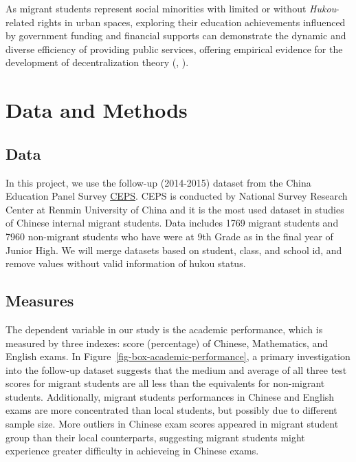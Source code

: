 \documentclass[
  man,
  floatsintext,
  longtable,
  nolmodern,
  notxfonts,
  notimes,
  colorlinks=true,linkcolor=blue,citecolor=blue,urlcolor=blue]{apa7}
\begin{document}
As migrant students represent social minorities with limited or without
\emph{Hukou}-related rights in urban spaces, exploring their education
achievements influenced by government funding and financial supports can
demonstrate the dynamic and diverse efficiency of providing public
services, offering empirical evidence for the development of
decentralization theory
(,
).

\section{Data and Methods}\label{data-and-methods}

\subsection{Data}\label{data}

In this project, we use the follow-up (2014-2015) dataset from the China
Education Panel Survey
\href{http://ceps.ruc.edu.cn/English/Home.htm}{CEPS}. CEPS is conducted
by National Survey Research Center at Renmin University of China and it
is the most used dataset in studies of Chinese internal migrant
students. Data includes 1769 migrant students and 7960 non-migrant
students who have were at 9th Grade as in the final year of Junior High.
We will merge datasets based on student, class, and school id, and
remove values without valid information of hukou status.

\subsection{Measures}\label{measures}

The dependent variable in our study is the academic performance, which
is measured by three indexes: score (percentage) of Chinese,
Mathematics, and English exams. In
Figure~\ref{fig-box-academic-performance}, a primary investigation into
the follow-up dataset suggests that the medium and average of all three
test scores for migrant students are all less than the equivalents for
non-migrant students. Additionally, migrant students performances in
Chinese and English exams are more concentrated than local students, but
possibly due to different sample size. More outliers in Chinese exam
scores appeared in migrant student group than their local counterparts,
suggesting migrant students might experience greater difficulty in
achieveing in Chinese exams.
\end{document}
